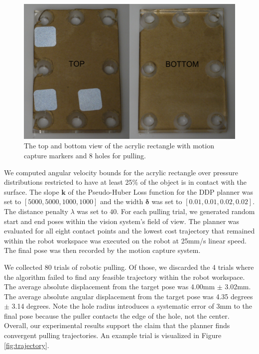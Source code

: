 \documentclass[conference]{IEEEtran}
\begin{document}
\begin{figure}
\begin{center}
  \includegraphics[width=\columnwidth]{fig/object}
\end{center}
\caption{The top and bottom view of the acrylic rectangle with motion
  capture markers and 8 holes for pulling.}
\label{fig:object}
\end{figure}

We computed angular velocity bounds for the acrylic rectangle over
pressure distributions restricted to have at least 25\% of the object
is in contact with the surface. The slope $\mathbf{k}$ of the
Pseudo-Huber Loss function for the DDP planner was set to
$[5000, 5000, 1000, 1000]$ and the width $\bm{\delta}$ was set to
$[0.01, 0.01, 0.02, 0.02]$. The distance penalty $\lambda$ was set to
$40$. For each pulling trial, we generated random start and end poses
within the vision system's field of view. The planner was evaluated
for all eight contact points and the lowest cost trajectory that
remained within the robot workspace was executed on the robot at
25mm/s linear speed. The final pose was then recorded by the motion
capture system.

We collected 80 trials of robotic pulling. Of those, we discarded the
4 trials where the algorithm failed to find any feasible trajectory
within the robot workspace. The average absolute displacement from the
target pose was 4.00mm $\pm$ 3.02mm. The average absolute angular
displacement from the target pose was 4.35 degrees $\pm$ 3.14
degrees. Note the hole radius introduces a systematic error of 3mm to
the final pose because the puller contacts the edge of the hole, not
the center. Overall, our experimental results support the claim that
the planner finds convergent pulling trajectories. An example trial is
visualized in Figure \ref{fig:trajectory}.
\end{document}

